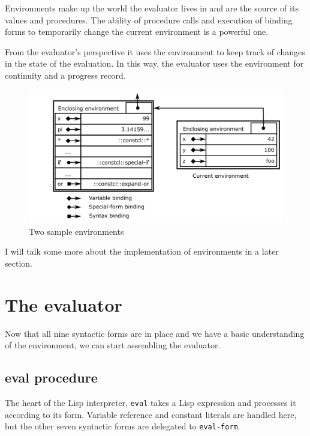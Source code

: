 \documentclass[a5paper,draft]{memoir}
\begin{document}
Environments make up the world the evaluator lives in and are the source of its values and procedures. The ability of procedure calls and execution of binding forms to temporarily change the current environment is a powerful one.

From the evaluator's perspective it uses the environment to keep track of changes in the state of the evaluation. In this way, the evaluator uses the environment for continuity and a progress record.

\begin{figure}[h!]\includegraphics{images/environments.png}\captionsetup{labelformat=empty}\caption{Two sample environments}\label{fig:two-sample-environments}\end{figure}

I will talk some more about the implementation of environments in a later section.

\section{The evaluator}
\label{the-evaluator}

Now that all nine syntactic forms are in place and we have a basic understanding of the environment, we can start assembling the evaluator.

\subsection{eval procedure}
\label{eval-procedure}

The heart of the Lisp interpreter, \texttt{eval} takes a Lisp expression and processes it according to its form. Variable reference and constant literals are handled here, but the other seven syntactic forms are delegated to \texttt{eval-form}.
\end{document}
